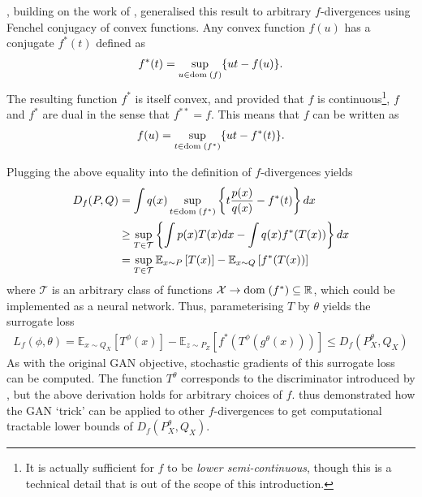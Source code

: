 \cite{f-gan}, building on the work of \cite{nguyen}, generalised this result to arbitrary $f$-divergences using Fenchel conjugacy of convex functions.
Any convex function $f(u)$ has a conjugate $f^*(t)$ defined as 
%
\begin{align*}
f^*(t) = \sup_{u \in {\bf{\rm dom}}\;(f)} \{ut - f(u)\}.
\end{align*}
%
The resulting function $f^*$ is itself convex, and
provided that $f$ is continuous\footnote{It is actually sufficient for $f$ to be \emph{lower semi-continuous}, though this is a technical detail that is out of the scope of this introduction.}, $f$ and $f^*$ are dual in the sense that $f^{**} = f$.
This means that $f$ can be written as
%
\begin{align*}
f(u) = \sup_{t \in {\bf{\rm dom}}\;(f^*)} \{ut - f^*(t)\}.
\end{align*}

Plugging the above equality into the definition of $f$-divergences yields
%
\begin{align*}
D_f(P, Q) &= \int q(x) \sup_{t \in {\bf{\rm dom}}\;(f^*)} \left\{t \frac{p(x)}{q(x)} - f^*(t) \right\} dx \\
& \geq \sup_{T \in \mathcal{T}} \left\{ \int p(x) T(x) dx - \int q(x) f^*(T(x)) \right\} dx \\
&= \sup_{T \in \mathcal{T}} \mathbb{E}_{x \sim P} \left[ T(x) \right] - \mathbb{E}_{x \sim Q} \left[ f^*(T(x)) \right] 
\end{align*}
%
where $\mathcal{T}$ is an arbitrary class of functions $\mathcal{X} \to {\bf{\rm dom}}\;(f^*) \subseteq \mathbb{R}$, which could be implemented as a neural network.
Thus, parameterising $T$ by $\theta$ yields the surrogate loss
%
\begin{align*}
L_f(\phi, \theta) = \mathbb{E}_{x \sim Q_X} \left[ T^\phi(x) \right] - \mathbb{E}_{z \sim P_Z} \left[ f^*(T^\phi(g^\theta(x))) \right] \leq D_f(P^\theta_X, Q_X)
\end{align*}
%
As with the original GAN objective, stochastic gradients of this surrogate loss can be computed. 
The function $T^\theta$ corresponds to the discriminator introduced by \cite{goodfellow}, but the above derivation holds for arbitrary choices of $f$. 
\cite{nowozin et al} thus demonstrated how the GAN `trick' can be applied to other $f$-divergences to get computational tractable lower bounds of $D_f(P^\theta_X, Q_X)$.

